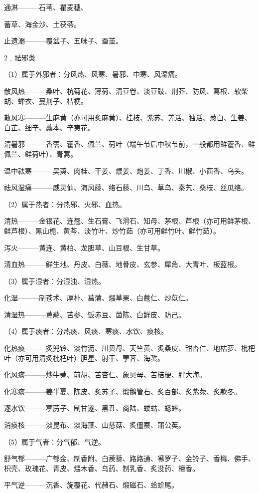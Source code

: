 \documentclass[12pt,UTF8]{ctexbook}
\begin{document}
通淋———石苇、瞿麦穗、

蓄草、海金沙、土茯苓。

止遗溺———覆盆子、五味子、蚕茧。

2﹒祛邪类

（1）属于外邪者：分风热、风寒、暑邪、中寒、风湿痛。

散风热———桑叶、杭菊花、薄荷、清豆卷、淡豆豉、荆芥、防风、葛根、软柴胡、蝉衣、蔓荆子、桔梗。

散风寒———生麻黄（亦可用炙麻黄）、桂枝、紫苏、羌活、独活、葱白、生姜、白芷、细辛、藁本、辛夷花。

清暑邪———香薷、藿香、佩兰、荷叶（端午节后中秋节前，一般都用鲜藿香、鲜佩兰、鲜荷叶）、青蒿。

温中祛寒———吴萸、肉桂、干姜、煨姜、炮姜、丁香、川椒、小茴香、乌头。

祛风湿痛———威灵仙、海风藤、络石藤、川乌、草乌、秦艽、桑枝、丝瓜络。

（2）属于热者：分热邪、火邪、血热。

清热———金银花、连翘、生石膏、飞滑石、知母、茅根、芦根（亦可用鲜茅根、鲜芦根）、黑山栀、黄芩、淡竹叶、炒竹茹（亦可用鲜竹叶、鲜竹茹）。

泻火———黄连、黄柏、龙胆草、山豆根、生甘草。

清血热———鲜生地、丹皮、白薇、地骨皮、玄参、犀角、大青叶、板蓝根。

（3）属于湿者：分湿浊、湿热。

化湿———制苍术、厚朴、菖蒲、煨草果、白蔻仁、炒苡仁。

清湿热———萆薢、苦参、饭赤豆、茵陈、白鲜皮、防己。

（4）属于痰者：分热痰、风痰、寒痰、水饮、痰核。

化热痰———炙兜铃、淡竹沥、川贝母、天竺黄、炙桑皮、甜杏仁、地枯萝、枇杷叶（亦可用清炙枇杷叶）胆星、射干、荸荠、海蜇。

化风痰———炒牛蒡、前胡、苦杏仁、象贝母、苦桔梗、胖大海。

化寒痰———姜半夏、陈皮、炙苏子、煅鹅管石、炙百部、炙紫菀、炙款冬。

逐水饮———葶苈子、制甘遂、黑丑、商陆、蝼蛄、蟋蟀。

消痰核———淡昆布、淡海藻、山慈菇、炙僵蚕、蒲公英。

（5）属于气者：分气郁、气逆。

舒气郁———广郁金、制香附、白蒺藜、路路通、囌罗子、金铃子、香橼、佛手、枳壳、玫瑰花、青皮、煨木香、乌药、制乳香、炙没药、檀香。

平气逆———沉香、旋覆花、代赭石、煅磁石、蛤蚧尾。
\end{document}
